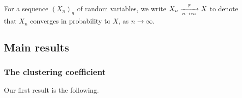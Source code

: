 For a sequence $(X_n)_n$ of random variables, we write $X_n \xrightarrow[n\to\infty]{\mathbb{P}} X$ to denote that $X_n$ converges in probability to $X$, as $n \to \infty$. %

\subsection{Main results}\label{ssec:main_results}


\subsubsection{The clustering coefficient}

Our first result is the following.


